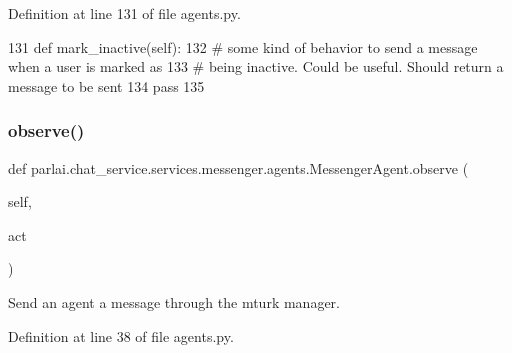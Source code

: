 Definition at line 131 of file agents.\+py.


\begin{DoxyCode}
131     \textcolor{keyword}{def }mark\_inactive(self):
132         \textcolor{comment}{# some kind of behavior to send a message when a user is marked as}
133         \textcolor{comment}{# being inactive. Could be useful. Should return a message to be sent}
134         \textcolor{keywordflow}{pass}
135 
\end{DoxyCode}
\mbox{\label{classparlai_1_1chat__service_1_1services_1_1messenger_1_1agents_1_1MessengerAgent_aed8303ffef9e83bb5071ce7ab4f77bc6}} 
\subsubsection{\texorpdfstring{observe()}{observe()}}
{\footnotesize\ttfamily def parlai.\+chat\+\_\+service.\+services.\+messenger.\+agents.\+Messenger\+Agent.\+observe (\begin{DoxyParamCaption}\item[{}]{self,  }\item[{}]{act }\end{DoxyParamCaption})}

\begin{DoxyVerb}Send an agent a message through the mturk manager.
\end{DoxyVerb}
 

Definition at line 38 of file agents.\+py.


